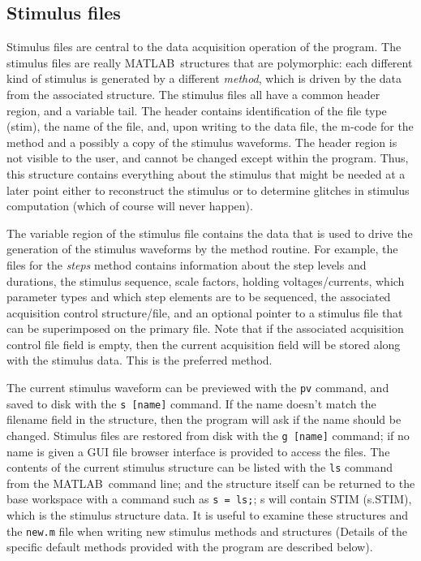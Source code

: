 \documentclass[11pt, letterpaper, titlepage]{paper}
\newcommand{\ml}{\textsf{MATLAB}}
\begin{document}
\subsection{Stimulus files}
Stimulus files are central to the data acquisition operation of the program. The stimulus 
files are really \ml\ structures that are polymorphic: each different kind of stimulus is 
generated by a different \textit{method}, which is driven by the data from the associated 
structure. The stimulus files all have a common header region, and a variable tail. The 
header contains identification of the file type (stim), the name of the file, and, upon 
writing to the data file, the m-code for the method and a possibly a copy of the stimulus 
waveforms. The header region is not visible to the user, and cannot be changed except 
within the program. Thus, this structure contains everything about the stimulus that 
might be needed at a later point either to reconstruct the stimulus or to determine 
glitches in stimulus computation (which of course will never happen).

The variable region of the stimulus file contains the data that is used to drive the 
generation of the stimulus waveforms by the method routine. For example, the files for 
the \textit{steps} method contains information about the step levels and durations, the 
stimulus sequence, scale factors, holding voltages/currents, which parameter types and 
which step elements are to be sequenced, the associated acquisition control 
structure/file, and an optional pointer to a stimulus file that can be superimposed on 
the primary file. Note that if the associated acquisition control file field is empty, 
then the current acquisition field will be stored along with the stimulus data. This is 
the preferred method.

The current stimulus waveform can be previewed with the \texttt{pv} command, and saved to 
disk with the \texttt{s [name]} command. If the name doesn't match the filename field in 
the structure, then the program will ask if the name should be changed. Stimulus files 
are restored from disk with the \texttt{g [name]} command; if no name is given a GUI file 
browser interface is provided to access the files. The contents of the current stimulus 
structure can be listed with the \texttt{ls} command from the \ml\ command line; and the 
structure itself can be returned to the base workspace with a command such as \texttt{s = 
ls;}; s will contain STIM (s.STIM), which is the stimulus structure data. It is useful to 
examine these structures and the \texttt{new.m} file when writing new stimulus methods 
and structures (Details of the specific default methods provided with the program are 
described below).
\end{document}
